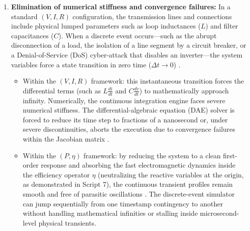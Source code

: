 \documentclass[energies,accept,oneauthor,pdftex]{Definitions/mdpi}
\begin{document}
\begin{enumerate}
    \item \textbf{Elimination of numerical stiffness and convergence failures:}
    In a standard $(V, I, R)$ configuration, the transmission lines and connections include physical lumped parameters such as loop inductances ($L$) and filter capacitances ($C$). When a discrete event occurs---such as the abrupt disconnection of a load, the isolation of a line segment by a circuit breaker, or a Denial-of-Service (DoS) cyber-attack that disables an inverter---the system variables force a state transition in zero time ($\Delta t \to 0$) \cite{moutevelis2024taxonomy, pr13092969}.
    \begin{itemize}
        \item Within the $(V, I, R)$ framework: this instantaneous transition forces the differential terms (such as $L \frac{di}{dt}$ and $C \frac{dv}{dt}$) to mathematically approach infinity. Numerically, the continuous integration engine faces severe numerical stiffness. The differential-algebraic equation (DAE) solver is forced to reduce its time step to fractions of a nanosecond or, under severe discontinuities, aborts the execution due to convergence failures within the Jacobian matrix \cite{en19020304, moutevelis2024taxonomy}.
        \item Within the $(P, \eta)$ framework: by reducing the system to a clean first-order response and absorbing the fast electromagnetic dynamics inside the efficiency operator $\eta$ (neutralizing the reactive variables at the origin, as demonstrated in Script 7), the continuous transient profiles remain smooth and free of parasitic oscillations \cite{en17143468, biom11020343}. The discrete-event simulator can jump sequentially from one timestamp contingency to another without handling mathematical infinities or stalling inside microsecond-level physical transients.
    \end{itemize}


\end{enumerate}
\end{document}
